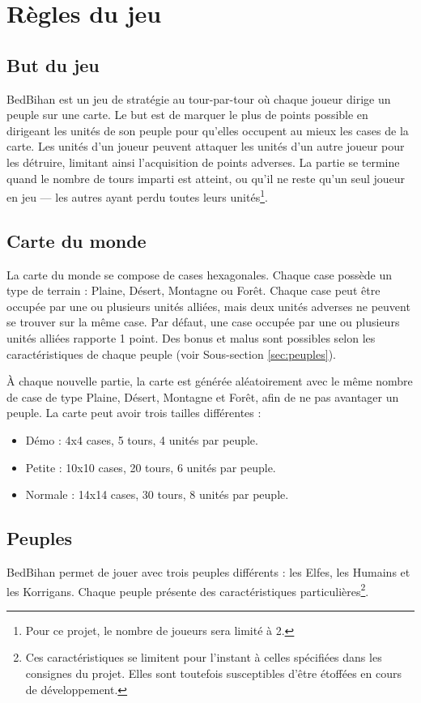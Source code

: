 
	\section{Règles du jeu}
	\label{sec:regles}

	\subsection{But du jeu}
	\label{subsec:butdujeu}
	BedBihan est un jeu de stratégie au tour-par-tour où chaque joueur dirige un peuple sur une carte. Le but est de marquer le plus de points possible en dirigeant les unités de son peuple pour qu'elles occupent au mieux les cases de la carte. Les unités d’un joueur peuvent attaquer les unités d’un autre joueur pour les détruire, limitant ainsi l'acquisition de points adverses. La partie se termine quand le nombre de tours imparti est atteint, ou qu'il ne reste qu'un seul joueur en jeu --- les autres ayant perdu toutes leurs unités\footnote{Pour ce projet, le nombre de joueurs sera limité à 2.}.

	\subsection{Carte du monde}
	\label{subsec:carte}
	La carte du monde se compose de cases hexagonales. Chaque case possède un type de terrain : Plaine,	Désert, Montagne ou Forêt. Chaque case peut être occupée par une ou plusieurs unités alliées, mais deux unités adverses ne peuvent se trouver sur la même case. Par défaut, une case occupée par une ou plusieurs unités alliées rapporte 1 point. Des bonus et malus sont possibles selon les caractéristiques de chaque peuple (voir Sous-section \ref{sec:peuples}). 
	
	À chaque nouvelle partie, la carte est générée aléatoirement avec le même nombre de case de type Plaine, Désert, Montagne et Forêt, afin de ne pas avantager un peuple. 
	La carte peut avoir trois tailles différentes :
	\begin{itemize}
		\item Démo : 4x4 cases, 5 tours, 4 unités par peuple.
		\item Petite : 10x10 cases, 20 tours, 6 unités par peuple.
		\item Normale : 14x14 cases, 30 tours, 8 unités par peuple.
	\end{itemize}
	
	
	\subsection{Peuples}
	\label{subsec:peuples}
	BedBihan permet de jouer avec trois peuples différents : les Elfes, les Humains et les Korrigans. Chaque peuple présente des caractéristiques particulières\footnote{Ces caractéristiques se limitent pour l'instant à celles spécifiées dans les consignes du projet. Elles sont toutefois susceptibles d'être étoffées en cours de développement.}.
	
